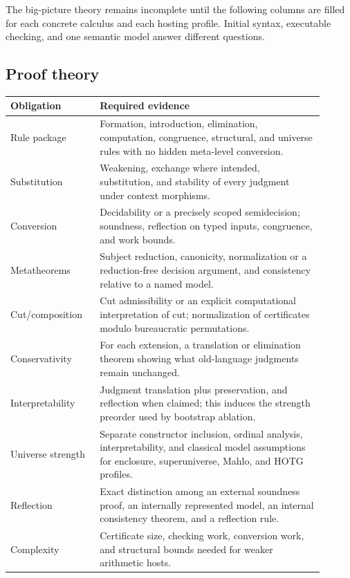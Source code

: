 \documentclass[11pt]{article}
\theoremstyle{definition}
\theoremstyle{remark}
\begin{document}
The big-picture theory remains incomplete until the following columns are filled
for each concrete calculus and each hosting profile.  Initial syntax, executable
checking, and one semantic model answer different questions.

\subsection{Proof theory}

\begin{longtable}{>{\raggedright\arraybackslash}p{0.25\linewidth}%
                  >{\raggedright\arraybackslash}p{0.65\linewidth}}
\toprule
Obligation & Required evidence \\
\midrule
\endhead
Rule package & Formation, introduction, elimination, computation, congruence,
  structural, and universe rules with no hidden meta-level conversion. \\
Substitution & Weakening, exchange where intended, substitution, and stability of
  every judgment under context morphisms. \\
Conversion & Decidability or a precisely scoped semidecision; soundness,
  reflection on typed inputs, congruence, and work bounds. \\
Metatheorems & Subject reduction, canonicity, normalization or a reduction-free
  decision argument, and consistency relative to a named model. \\
Cut/composition & Cut admissibility or an explicit computational interpretation
  of cut; normalization of certificates modulo bureaucratic permutations. \\
Conservativity & For each extension, a translation or elimination theorem showing
  what old-language judgments remain unchanged. \\
Interpretability & Judgment translation plus preservation, and reflection when
  claimed; this induces the strength preorder used by bootstrap ablation. \\
Universe strength & Separate constructor inclusion, ordinal analysis,
  interpretability, and classical model assumptions for enclosure,
  superuniverse, Mahlo, and HOTG profiles. \\
Reflection & Exact distinction among an external soundness proof, an internally
  represented model, an internal consistency theorem, and a reflection rule. \\
Complexity & Certificate size, checking work, conversion work, and structural
  bounds needed for weaker arithmetic hosts. \\
\bottomrule
\end{longtable}
\end{document}
